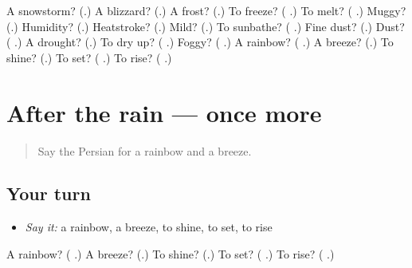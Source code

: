 \begin{tcolorbox}[breakable,colback=teal!4,colframe=teal!35!black,title={Before you move on}]
A snowstorm? (\textbf{}.) A blizzard? (\textbf{}.) A frost? (\textbf{}.) To freeze? (\textbf{ }.) To melt? (\textbf{ }.) Muggy? (\textbf{}.) Humidity? (\textbf{}.) Heatstroke? (\textbf{}.) Mild? (\textbf{}.) To sunbathe? (\textbf{ }.) Fine dust? (\textbf{}.) Dust? (\textbf{  }.) A drought? (\textbf{}.) To dry up? (\textbf{ }.) Foggy? (\textbf{ }.) A rainbow? (\textbf{ }.) A breeze? (\textbf{}.) To shine? (\textbf{}.) To set? (\textbf{ }.) To rise? (\textbf{ }.)
\end{tcolorbox}
\section[(dialogue)]{After the rain — once more}

\label{lesson:FA-R479-review-final-479}



\begin{quote}
Say the Persian for a rainbow and a breeze.
\end{quote}

\subsection*{Your turn}
\begin{itemize}
\raggedright
  \item \emph{Say it:} a rainbow, a breeze, to shine, to set, to rise
\end{itemize}

\begin{tcolorbox}[breakable,colback=teal!4,colframe=teal!35!black,title={Before you move on}]
A rainbow? (\textbf{ }.) A breeze? (\textbf{}.) To shine? (\textbf{}.) To set? (\textbf{ }.) To rise? (\textbf{ }.)
\end{tcolorbox}
